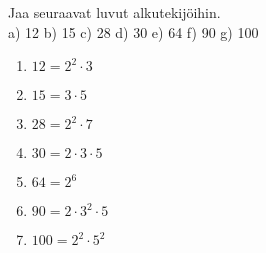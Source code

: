 \begin{tehtava}
Jaa seuraavat luvut alkutekijöihin.\\
a) 12 \quad b) 15 \quad c) 28 \quad d) 30 \quad e) 64 \quad f) 90 \quad g) 100

\begin{vastaus}
\begin{enumerate}
	\item $12 = 2^2 \cdot 3$
	\item $15 = 3 \cdot 5$
	\item $28 = 2^2 \cdot 7$
	\item $30 = 2 \cdot 3 \cdot 5$
	\item $64 = 2^6$
	\item $90 = 2 \cdot 3^2 \cdot 5$
	\item $100 = 2^2 \cdot 5^2$
\end{enumerate}
\end{vastaus}
\end{tehtava}